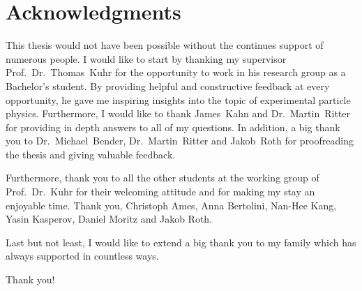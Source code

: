 \thispagestyle{empty}
\chapter*{Acknowledgments}

This thesis would not have been possible without the continues support of numerous people. I would like to start by thanking my supervisor Prof.~Dr.~Thomas~Kuhr for the opportunity to work in his research group as a Bachelor's student. By providing helpful and constructive feedback at every opportunity, he gave me inspiring insights into the topic of experimental particle physics. Furthermore, I would like to thank James~Kahn and Dr.~Martin~Ritter for providing in depth answers to all of my questions.
In addition, a big thank you to Dr.~Michael~Bender, Dr.~Martin~Ritter and Jakob~Roth for proofreading the thesis and giving valuable feedback.

Furthermore, thank you to all the other students at the working group of Prof.~Dr.~Kuhr for their welcoming attitude and for making my stay an enjoyable time. Thank you, Christoph Ames, Anna Bertolini, Nan-Hee Kang, Yasin Kasperov, Daniel Moritz and Jakob Roth.

Last but not least, I would like to extend a big thank you to my family which has always supported in countless ways.

Thank you!
